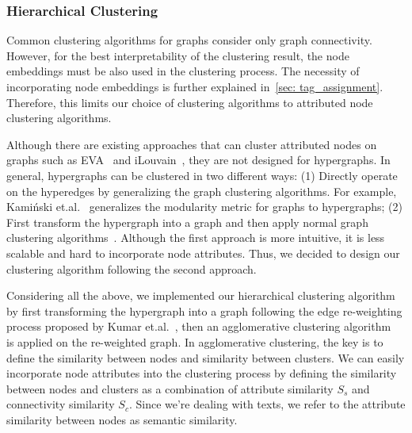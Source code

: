 \subsubsection{Hierarchical Clustering}\label{sec: clustering}
Common clustering algorithms for graphs consider only graph connectivity.
However, for the best interpretability of the clustering result, the node embeddings must be also used in the clustering process.
The necessity of incorporating node embeddings is further explained in~\autoref{sec: tag_assignment}.
Therefore, this limits our choice of clustering algorithms to attributed node clustering algorithms.

Although there are existing approaches that can cluster attributed nodes on graphs such as EVA~\cite{citraro2020eva} and iLouvain~\cite{combe2015louvain}, they are not designed for hypergraphs.
In general, hypergraphs can be clustered in two different ways: 
(1) Directly operate on the hyperedges by generalizing the graph clustering algorithms.
For example, Kamiński et.al.~\cite{kaminski2021hgraphcommunity} generalizes the modularity metric for graphs to hypergraphs; 
(2) First transform the hypergraph into a graph and then apply normal graph clustering algorithms~\cite{kumar2020new}.
Although the first approach is more intuitive, it is less scalable and hard to incorporate node attributes.
Thus, we decided to design our clustering algorithm following the second approach.

Considering all the above, we implemented our hierarchical clustering algorithm by first transforming the hypergraph into a graph following the edge re-weighting process proposed by Kumar et.al.~\cite{kumar2020new},
then an agglomerative clustering algorithm~\cite{steinbach2000doccluster} is applied on the re-weighted graph.
In agglomerative clustering, the key is to define the similarity between nodes and similarity between clusters.
We can easily incorporate node attributes into the clustering process by defining the similarity between nodes and clusters as a combination of attribute similarity $S_s$ and connectivity similarity $S_c$.
Since we're dealing with texts, we refer to the attribute similarity between nodes as semantic similarity. 

